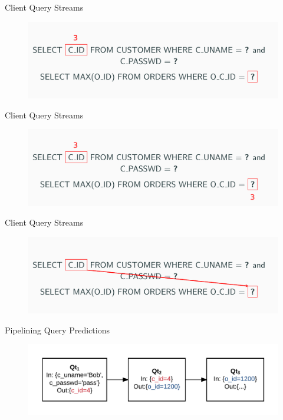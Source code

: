 \documentclass[10pt]{beamer}
\begin{document}
\begin{frame}[fragile]{Client Query Streams}
    \begin{figure}
        \includegraphics[scale=0.25]{apollo_parameter_mappings_2}
    \end{figure}
\end{frame}

\begin{frame}[fragile]{Client Query Streams}
    \begin{figure}
        \includegraphics[scale=0.25]{apollo_parameter_mappings_3}
    \end{figure}
\end{frame}

\begin{frame}[fragile]{Client Query Streams}
    \begin{figure}
        \includegraphics[scale=0.25]{apollo_parameter_mappings_4}
    \end{figure}
\end{frame}

\begin{frame}[fragile]{Pipelining Query Predictions}
    \begin{figure}
        \includegraphics[scale=0.22]{apollo_query_pipeline}
    \end{figure}
\end{frame}
\end{document}
